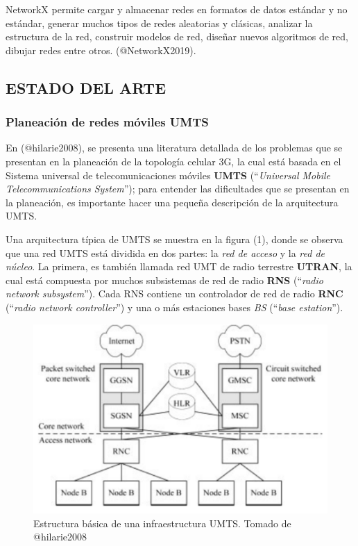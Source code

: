 \documentclass[]{article}
\begin{document}
NetworkX permite cargar y almacenar redes en formatos de datos estándar
y no estándar, generar muchos tipos de redes aleatorias y clásicas,
analizar la estructura de la red, construir modelos de red, diseñar
nuevos algoritmos de red, dibujar redes entre otros. (@NetworkX2019).

\subsection{ESTADO DEL ARTE}\label{estado-del-arte}

\subsubsection{Planeación de redes móviles
UMTS}\label{planeaciuxf3n-de-redes-muxf3viles-umts}

En (@hilarie2008), se presenta una literatura detallada de los problemas
que se presentan en la planeación de la topología celular 3G, la cual
está basada en el Sistema universal de telecomunicaciones móviles
\textbf{UMTS} (``\emph{Universal Mobile Telecommunications System}'');
para entender las dificultades que se presentan en la planeación, es
importante hacer una pequeña descripción de la arquitectura UMTS.

Una arquitectura típica de UMTS se muestra en la figura (1), donde se
observa que una red UMTS está dividida en dos partes: la \emph{red de
acceso} y la \emph{red de núcleo}. La primera, es también llamada red
UMT de radio terrestre \textbf{UTRAN}, la cual está compuesta por muchos
subsistemas de red de radio \textbf{RNS} (``\emph{radio network
subsystem}''). Cada RNS contiene un controlador de red de radio
\textbf{RNC} (``\emph{radio network controller}'') y una o más
estaciones bases \emph{BS} (``\emph{base estation}'').

\begin{figure}
\centering
\includegraphics{UMTS.pdf}
\caption{Estructura básica de una infraestructura UMTS. Tomado de
@hilarie2008}
\end{figure}
\end{document}
